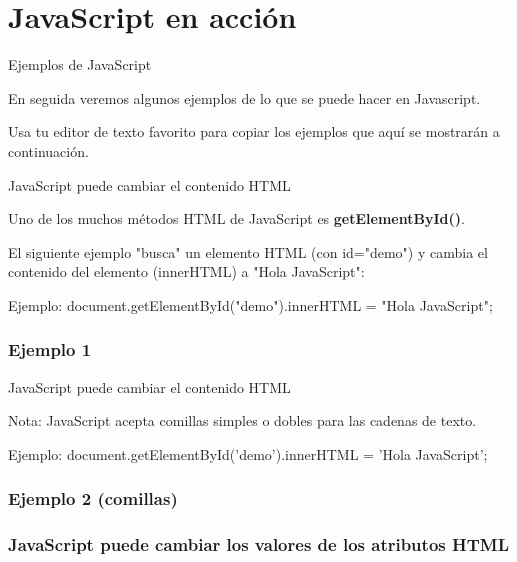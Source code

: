 \section{JavaScript en acción}

\begin{frame}[c]{Ejemplos de JavaScript}

  En seguida veremos algunos ejemplos de lo que se puede hacer en
  Javascript.

  \vspace{\baselineskip}
  Usa tu editor de texto favorito para copiar los ejemplos que aquí se
  mostrarán a continuación.
\end{frame}

\begin{frame}[c]{JavaScript puede cambiar el contenido HTML}

  Uno de los muchos métodos HTML de JavaScript es \textbf{getElementById()}.

  El siguiente ejemplo "busca" un elemento HTML (con id="demo") y cambia el
  contenido del elemento (innerHTML) a "Hola JavaScript":

  \vspace{\baselineskip}
  \begin{exampleblock}{Ejemplo:}
     document.getElementById("demo").innerHTML = "Hola JavaScript";
  \end{exampleblock}

\end{frame}

\begin{frame}[fragile]
  \frametitle{Ejemplo 1}
  
\end{frame}

\begin{frame}[c]{JavaScript puede cambiar el contenido HTML}

  \vspace{\baselineskip}
  \begin{alertblock}{Nota:}
    JavaScript acepta comillas simples o dobles para las cadenas de texto.
  \end{alertblock}

  \vspace{\baselineskip}
  \begin{exampleblock}{Ejemplo:}
     document.getElementById('demo').innerHTML = 'Hola JavaScript';
  \end{exampleblock}
\end{frame}

\begin{frame}[fragile]
  \frametitle{Ejemplo 2 (comillas)}
  
\end{frame}

\begin{frame}[fragile]
  \frametitle{JavaScript puede cambiar los valores de los atributos HTML}
  
\end{frame}
